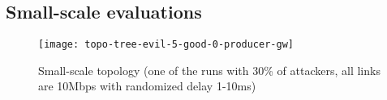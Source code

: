 \subsection{Small-scale evaluations}
\label{sec:small-scale}

\begin{figure}[htbp]
  \centering
  \texttt{[image: topo-tree-evil-5-good-0-producer-gw]}
  \caption{Small-scale topology (one of the runs with 30\% of attackers, all links are 10Mbps with randomized delay 1-10ms)}
  \label{fig:small-scale-topo}
\end{figure}


